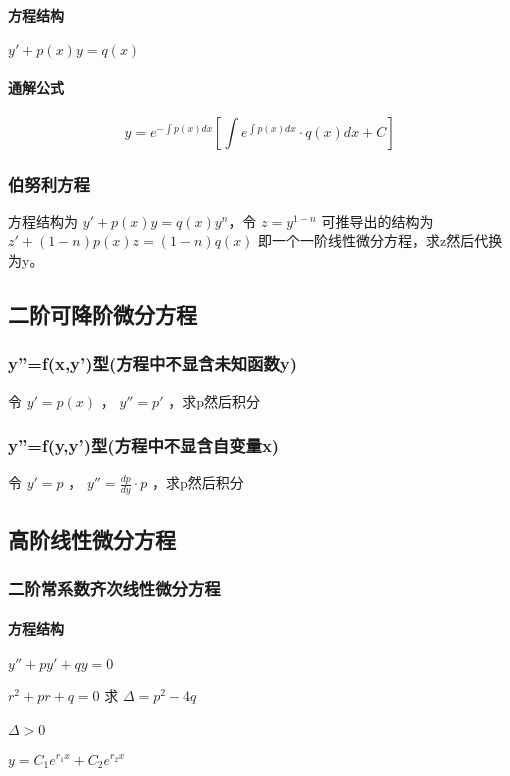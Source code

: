 ﻿\documentclass[a4paper,12pt,UTF8]{ctexart}
\begin{document}
    \paragraph{方程结构}\(y'+p(x)y=q(x)\)
    \paragraph{通解公式}
    \[y=e^{-\int p(x)dx}\left[\int e^{\int p(x)dx} \cdot q(x)dx+C\right]\]

    \subsubsection{伯努利方程}
    方程结构为 \(y'+p(x)y=q(x)y^{n}\)，令 \(z=y^{1-n}\) 可推导出的结构为 \(z'+(1-n)p(x)z=(1-n)q(x)\) 即一个一阶线性微分方程，求z然后代换为y。
    
    \subsection{二阶可降阶微分方程}
    
    \subsubsection{y''=f(x,y')型(方程中不显含未知函数y)}
    令 \(y'=p(x)\) ， \(y''=p'\) ，求p然后积分 
    
    \subsubsection{y''=f(y,y')型(方程中不显含自变量x)}
    令 \(y'=p\) ， \(y''=\frac{dp}{dy} \cdot p\) ，求p然后积分  
    
    \subsection{高阶线性微分方程}
    
    \subsubsection{二阶常系数齐次线性微分方程}
    \paragraph{方程结构} \(y''+py'+qy=0\)

    \(r^2+pr+q=0\) 求 \(\Delta=p^2-4q\)
    \paragraph{\(\Delta>0\)} \(y=C_1e^{r_1x}+C_2e^{r_2x}\)
\end{document}
